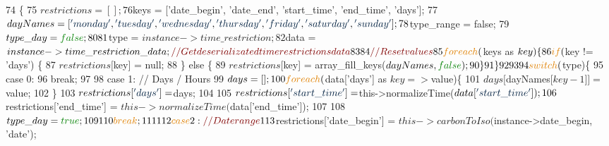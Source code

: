 \begin{DoxyCode}
74     \{
75         $restrictions = [];
76         $keys         = [\textcolor{stringliteral}{'date\_begin'}, \textcolor{stringliteral}{'date\_end'}, \textcolor{stringliteral}{'start\_time'}, \textcolor{stringliteral}{'end\_time'}, \textcolor{stringliteral}{'days'}];
77         $dayNames     = [\textcolor{stringliteral}{'monday'}, \textcolor{stringliteral}{'tuesday'}, \textcolor{stringliteral}{'wednesday'}, \textcolor{stringliteral}{'thursday'}, \textcolor{stringliteral}{'friday'}, \textcolor{stringliteral}{'saturday'}, \textcolor{stringliteral}{'sunday'}];
78         $type\_range   = \textcolor{keyword}{false};
79         $type\_day     = \textcolor{keyword}{false};
80         
81         $type         = $instance->time\_restriction;
82         $data         = $instance->time\_restriction\_data; \textcolor{comment}{// Get deserializated time restrictions data}
83         
84         \textcolor{comment}{// Reset values}
85         \textcolor{keywordflow}{foreach}($keys as $key)\{
86             \textcolor{keywordflow}{if} ($key != \textcolor{stringliteral}{'days'}) \{
87                 $restrictions[$key] = null;
88             \} \textcolor{keywordflow}{else} \{
89                 $restrictions[$key] = array\_fill\_keys($dayNames, \textcolor{keyword}{false});
90             \}
91         \}
92 
93                
94         \textcolor{keywordflow}{switch}($type)\{
95             \textcolor{keywordflow}{case} 0:
96                 \textcolor{keywordflow}{break};
97             
98             \textcolor{keywordflow}{case} 1: \textcolor{comment}{// Days / Hours}
99                 $days = [];
100                 \textcolor{keywordflow}{foreach}($data[\textcolor{stringliteral}{'days'}] as $key => $value)\{
101                     $days[ $dayNames[$key-1] ] = $value;
102                 \}
103                 $restrictions[\textcolor{stringliteral}{'days'}] = $days;
104 
105                 $restrictions[\textcolor{stringliteral}{'start\_time'}] = $this->normalizeTime($data[\textcolor{stringliteral}{'start\_time'}]);
106                 $restrictions[\textcolor{stringliteral}{'end\_time'}]   = $this->normalizeTime($data[\textcolor{stringliteral}{'end\_time'}]);
107                 
108                 $type\_day = \textcolor{keyword}{true};
109                 
110                 \textcolor{keywordflow}{break};
111             
112             \textcolor{keywordflow}{case} 2: \textcolor{comment}{// Date range}
113                 $restrictions[\textcolor{stringliteral}{'date\_begin'}] = $this->carbonToIso($instance->date\_begin, \textcolor{stringliteral}{'date'});

\end{DoxyCode}
